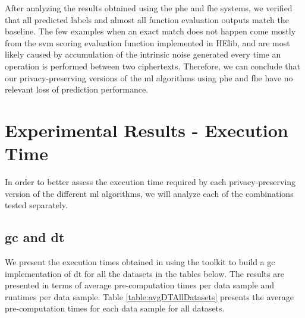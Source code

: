 After analyzing the results obtained using the \ac{phe} and \ac{fhe} systems, we verified that all predicted labels and almost all function evaluation outputs match the baseline. The few examples when an exact match does not happen come mostly from the \ac{svm} scoring evaluation function implemented in HElib, and are most likely caused by accumulation of the intrinsic noise generated every time an operation is performed between two ciphertexts. Therefore, we can conclude that our privacy-preserving versions of the \ac{ml} algorithms using \ac{phe} and \ac{fhe} have no relevant loss of prediction performance.

\section{Experimental Results - Execution Time}
\label{sec:ExperimentalResultsExecutionTime}

In order to better assess the execution time required by each privacy-preserving version of the different \ac{ml} algorithms, we will analyze each of the combinations tested separately.


\subsection{\acl{gc} and \acl{dt}}

We present the execution times obtained in using the toolkit to build a \ac{gc} implementation of \ac{dt} for all the datasets in the tables below. The results are presented in terms of average pre-computation times per data sample and runtimes per data sample. Table \ref{table:avgDTAllDatasets} presents the average pre-computation times for each data sample for all datasets.


